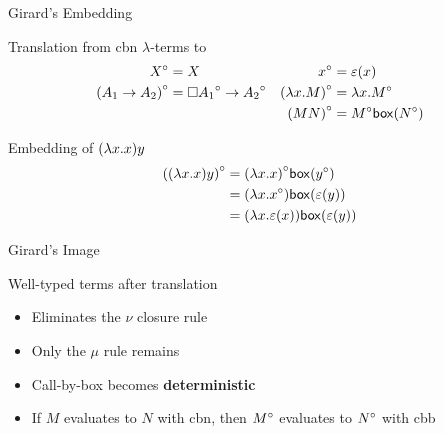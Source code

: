 \documentclass{beamer}
\theoremstyle{definition}
\begin{document}
  \begin{frame}{Girard's Embedding}
    \begin{block}{Translation from \textsf{cbn} $\lambda$-terms to \lab}
      \begin{align*}
        {X}^\circ                 & = X                                          & {x}^\circ             & = \varepsilon(x) \\
        {(A_1 \to A_2)}^\circ     & = \square{{A_1}^\circ} \to {A_2}^\circ       & {(\lambda {x}.{M})}^\circ & = \lambda {x}.{{M}^\circ} \\
                                   &                                              & {(M N)}^\circ         & = {M}^\circ \mathsf{box}({{N}^\circ})
      \end{align*}
    \end{block}
    \begin{block}{Embedding of \boldmath${(\lambda {x}.{x}) y}$}
      \begin{align*}
        {((\lambda{x}.{x}) y)}^\circ & = {(\lambda {x}.{x})}^\circ \mathsf{box}({{y}^\circ}) \\
                                   & = (\lambda {x}.{{x}^\circ}) \mathsf{box}({\varepsilon(y)})   \\
                                   & = (\lambda {x}.{\varepsilon(x)}) \mathsf{box}({\varepsilon(y)})
      \end{align*}
    \end{block}
  \end{frame}

  \begin{frame}{Girard's Image}
    \begin{block}{Well-typed terms after translation}
      \vspace{7pt}
      \begin{grammar}{
      }
      \end{grammar}
    \end{block}
    \vspace{5pt}
    \begin{itemize}
      \item[\textbullet] Eliminates the $\nu$ closure rule
      \item[\textbullet] Only the $\mu$ rule remains
      \item[\textbullet] Call-by-box becomes \textbf{deterministic}
      \item[\textbullet] If $M$ evaluates to $N$ with \textsf{cbn}, then ${M}^\circ$ evaluates to ${N}^\circ$ with \textsf{cbb} 
    \end{itemize}
  \end{frame}
\end{document}
